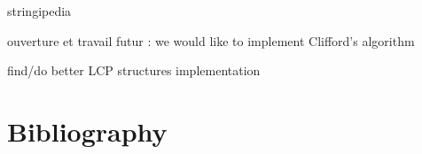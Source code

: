 \documentclass[preprint,12pt]{elsarticle}
\begin{document}
stringipedia


ouverture et travail futur : we would like to implement Clifford's algorithm

								find/do better LCP structures implementation 





\section*{Bibliography}









\end{document}
